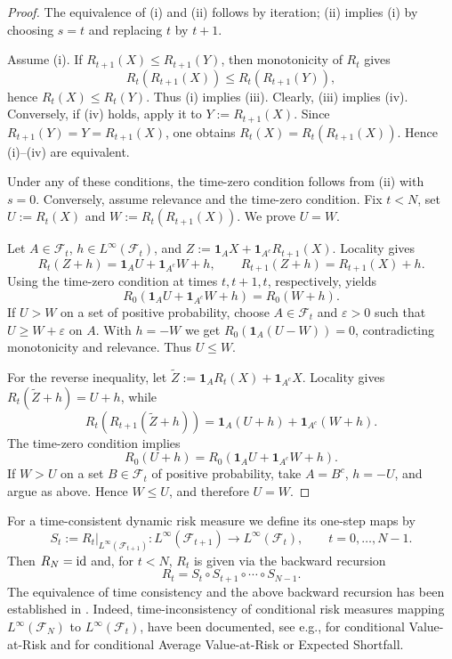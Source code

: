 \documentclass[a4paper]{amsart}
\theoremstyle{definition}
\newcommand{\F}{\mathcal{F}}
\newcommand{\id}{\textup{id}}
\begin{document}
\begin{proof}
The equivalence of (i) and (ii) follows by iteration; (ii) implies (i) by
choosing \(s=t\) and replacing \(t\) by \(t+1\).

Assume (i). If \(R_{t+1}(X)\le R_{t+1}(Y)\), then monotonicity of \(R_t\)
gives
\[
R_t(R_{t+1}(X))\le R_t(R_{t+1}(Y)),
\]
hence \(R_t(X)\le R_t(Y)\). Thus (i) implies (iii). Clearly, (iii) implies
(iv). Conversely, if (iv) holds, apply it to \(Y:=R_{t+1}(X)\). Since
\(R_{t+1}(Y)=Y=R_{t+1}(X)\), one obtains
\(R_t(X)=R_t(R_{t+1}(X))\). Hence (i)--(iv) are equivalent.

Under any of these conditions, the time-zero condition follows from (ii) with
\(s=0\). Conversely, assume relevance and the time-zero condition. Fix
\(t<N\), set \(U:=R_t(X)\) and \(W:=R_t(R_{t+1}(X))\). We prove \(U=W\).

Let \(A\in\F_t\), \(h\in L^\infty(\F_t)\), and
\(Z:=\mathbf 1_AX+\mathbf 1_{A^c}R_{t+1}(X)\). Locality gives
\[
R_t(Z+h)=\mathbf 1_AU+\mathbf 1_{A^c}W+h,
\qquad
R_{t+1}(Z+h)=R_{t+1}(X)+h.
\]
Using the time-zero condition at times \(t,t+1,t\), respectively, yields
\[
R_0(\mathbf 1_AU+\mathbf 1_{A^c}W+h)=R_0(W+h).
\]
If \(U>W\) on a set of positive probability, choose \(A\in\F_t\) and
\(\varepsilon>0\) such that \(U\ge W+\varepsilon\) on \(A\). With \(h=-W\) we
get \(R_0(\mathbf 1_A(U-W))=0\), contradicting monotonicity and relevance.
Thus \(U\le W\).

For the reverse inequality, let
\(\widetilde Z:=\mathbf 1_AR_t(X)+\mathbf 1_{A^c}X\). Locality gives
\(R_t(\widetilde Z+h)=U+h\), while
\[
R_t(R_{t+1}(\widetilde Z+h))
=
\mathbf 1_A(U+h)+\mathbf 1_{A^c}(W+h).
\]
The time-zero condition implies
\[
R_0(U+h)=R_0(\mathbf 1_AU+\mathbf 1_{A^c}W+h).
\]
If \(W>U\) on a set \(B\in\F_t\) of positive probability, take
\(A=B^c\), \(h=-U\), and argue as above. Hence \(W\le U\), and therefore
\(U=W\).
\end{proof}

For a time-consistent dynamic risk measure we define its one-step maps by
\[
S_t:=R_t|_{L^\infty(\F_{t+1})}:
L^\infty(\F_{t+1})\to L^\infty(\F_t),
\qquad t=0,\dots,N-1.
\]
Then \(R_N=\id\) and, for \(t<N\), $R_t$ is given via the backward recursion
\[
R_t=S_t\circ S_{t+1}\circ\cdots\circ S_{N-1}.
\]
The equivalence of time consistency and the above backward recursion has been established in \cite{CheriditoDelbaenKupper2006, ruszczynski2010risk}. Indeed, time-inconsistency of conditional risk measures mapping $L^\infty(\F_N)$ to $L^\infty(\F_t)$, have been documented, see e.g., \cite{cheridito2009VaR} for conditional Value-at-Risk and \cite{Artzner2007} for conditional Average Value-at-Risk or Expected Shortfall.
\end{document}
